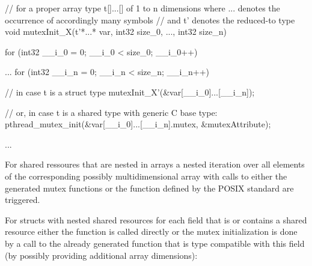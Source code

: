 \begin{ccode}
// for a proper array type t[]...[] of 1 to n dimensions where ... denotes the occurrence of accordingly many symbols 
// and t' denotes the reduced-to type
void mutexInit_X(t'*...* var, int32 size_0, ..., int32 size_n) { 
  for (int32 __i_0 = 0; __i_0 < size_0; __i_0++) { 
    ...
      for (int32 __i_n = 0; __i_n < size_n; __i_n++) {
        // in case t is a struct type
        mutexInit_X'(&var[__i_0]...[__i_n]);
        
        // or, in case t is a shared type with generic C base type:
        pthread_mutex_init(&var[__i_0]...[__i_n].mutex, &mutexAttribute);
      }
    ...
  } 
}
\end{ccode}
For shared ressoures that are nested in arrays a nested iteration over all elements of the corresponding possibly multidimensional array with calls to either the generated mutex functions or the function defined by the POSIX standard are triggered.

For structs with nested shared resources for each field that is or contains a shared resource either the  function is called directly or the mutex initialization is done by a call to the already generated function that is type compatible with this field (by possibly providing additional array dimensions):

